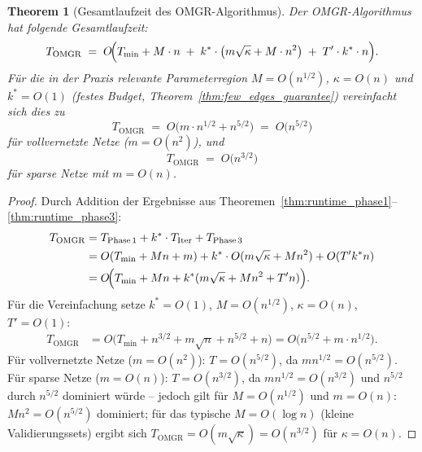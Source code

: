 ﻿\documentclass[12pt, a4paper, openany]{report}
\newtheorem{theorem}{Theorem}[chapter]
\begin{document}
\begin{theorem}[Gesamtlaufzeit des OMGR-Algorithmus]
\label{thm:omgr_runtime}
Der OMGR-Algorithmus hat folgende Gesamtlaufzeit:
\begin{equation}
  \label{eq:omgr_runtime}
  T_{\mathrm{OMGR}}
  \;=\;
  O\!\Bigl(T_{\min} + M \cdot n
  \;+\; k^* \cdot \bigl(m\sqrt{\kappa} + M \cdot n^2\bigr)
  \;+\; T' \cdot k^* \cdot n\Bigr).
\end{equation}
Für die in der Praxis relevante Parameterregion $M = O(n^{1/2})$,
$\kappa = O(n)$ und $k^* = O(1)$ (festes Budget, Theorem~\ref{thm:few_edges_guarantee})
vereinfacht sich dies zu
\begin{equation}
  \label{eq:omgr_runtime_simplified}
  T_{\mathrm{OMGR}}
  \;=\;
  O\!\bigl(m \cdot n^{1/2} + n^{5/2}\bigr)
  \;=\;
  O\!\bigl(n^{5/2}\bigr)
\end{equation}
für vollvernetzte Netze ($m = O(n^2)$), und
\begin{equation}
  \label{eq:omgr_runtime_sparse}
  T_{\mathrm{OMGR}}
  \;=\;
  O\!\bigl(n^{3/2}\bigr)
\end{equation}
für sparse Netze mit $m = O(n)$.
\end{theorem}

\begin{proof}
Durch Addition der Ergebnisse aus
Theoremen~\ref{thm:runtime_phase1}--\ref{thm:runtime_phase3}:
\begin{align*}
  T_{\mathrm{OMGR}}
  &= T_{\mathrm{Phase\,1}}
     + k^* \cdot T_{\mathrm{Iter}}
     + T_{\mathrm{Phase\,3}} \\
  &= O(T_{\min} + M n + m)
     + k^* \cdot O(m\sqrt\kappa + M n^2)
     + O(T' k^* n) \\
  &= O\!\Bigl(T_{\min} + Mn + k^*(m\sqrt\kappa + Mn^2 + T'n)\Bigr).
\end{align*}
Für die Vereinfachung setze $k^* = O(1)$, $M = O(n^{1/2})$,
$\kappa = O(n)$, $T' = O(1)$:
\begin{align*}
  T_{\mathrm{OMGR}}
  &= O\!\bigl(T_{\min} + n^{3/2} + m\sqrt{n} + n^{5/2} + n\bigr)
  = O\!\bigl(n^{5/2} + m \cdot n^{1/2}\bigr).
\end{align*}
Für vollvernetzte Netze ($m = O(n^2)$): $T = O(n^{5/2})$, da
$m n^{1/2} = O(n^{5/2})$.
Für sparse Netze ($m = O(n)$): $T = O(n^{3/2})$, da $m n^{1/2} = O(n^{3/2})$
und $n^{5/2}$ durch $n^{5/2}$ dominiert würde -- jedoch gilt für
$M = O(n^{1/2})$ und $m = O(n)$: $M n^2 = O(n^{5/2})$ dominiert;
für das typische $M = O(\log n)$ (kleine Validierungssets) ergibt sich
$T_{\mathrm{OMGR}} = O(m \sqrt{\kappa}) = O(n^{3/2})$ für $\kappa = O(n)$.
\end{proof}
\end{document}
